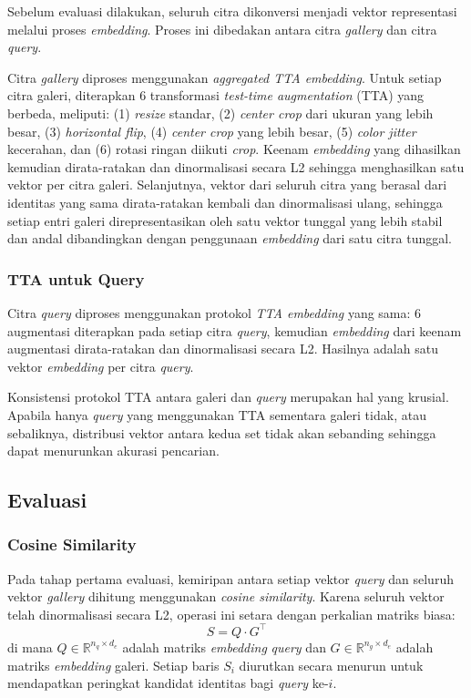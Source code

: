Sebelum evaluasi dilakukan, seluruh citra dikonversi menjadi vektor representasi melalui proses \textit{embedding}. Proses ini dibedakan antara citra \textit{gallery} dan citra \textit{query}.

Citra \textit{gallery} diproses menggunakan \textit{aggregated TTA embedding}. Untuk setiap citra galeri, diterapkan 6 transformasi \textit{test-time augmentation} (TTA) yang berbeda, meliputi: (1) \textit{resize} standar, (2) \textit{center crop} dari ukuran yang lebih besar, (3) \textit{horizontal flip}, (4) \textit{center crop} yang lebih besar, (5) \textit{color jitter} kecerahan, dan (6) rotasi ringan diikuti \textit{crop}. Keenam \textit{embedding} yang dihasilkan kemudian dirata-ratakan dan dinormalisasi secara L2 sehingga menghasilkan satu vektor per citra galeri. Selanjutnya, vektor dari seluruh citra yang berasal dari identitas yang sama dirata-ratakan kembali dan dinormalisasi ulang, sehingga setiap entri galeri direpresentasikan oleh satu vektor tunggal yang lebih stabil dan andal dibandingkan dengan penggunaan \textit{embedding} dari satu citra tunggal.

\subsubsection{TTA untuk Query}

Citra \textit{query} diproses menggunakan protokol \textit{TTA embedding} yang sama: 6 augmentasi diterapkan pada setiap citra \textit{query}, kemudian \textit{embedding} dari keenam augmentasi dirata-ratakan dan dinormalisasi secara L2. Hasilnya adalah satu vektor \textit{embedding} per citra \textit{query}.

Konsistensi protokol TTA antara galeri dan \textit{query} merupakan hal yang krusial. Apabila hanya \textit{query} yang menggunakan TTA sementara galeri tidak, atau sebaliknya, distribusi vektor antara kedua set tidak akan sebanding sehingga dapat menurunkan akurasi pencarian.

\subsection{Evaluasi}
\subsubsection{Cosine Similarity}

Pada tahap pertama evaluasi, kemiripan antara setiap vektor \textit{query} dan seluruh vektor \textit{gallery} dihitung menggunakan \textit{cosine similarity}. Karena seluruh vektor telah dinormalisasi secara L2, operasi ini setara dengan perkalian matriks biasa:
\begin{equation}
    S = Q \cdot G^\top
\end{equation}
di mana $Q \in \mathbb{R}^{n_q \times d_e}$ adalah matriks \textit{embedding} \textit{query} dan $G \in \mathbb{R}^{n_g \times d_e}$ adalah matriks \textit{embedding} galeri. Setiap baris $S_i$ diurutkan secara menurun untuk mendapatkan peringkat kandidat identitas bagi \textit{query} ke-$i$.

